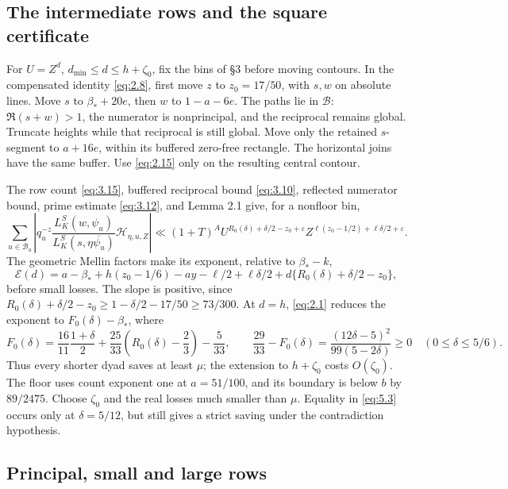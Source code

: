 \documentclass[11pt,a4paper]{article}
\begin{document}
\subsection{The intermediate rows and the square certificate}\label{sec:5.1}

For \(U=Z^d\), \(d_{\min}\le d\le h+\zeta_0\), fix the bins of §3 before moving contours. In the compensated identity \eqref{eq:2.8}, first move \(z\) to \(z_0=17/50\), with \(s,w\) on absolute lines. Move \(s\) to \(\beta_*+20e\), then \(w\) to \(1-a-6e\). The paths lie in \(\mathcal B\): \(\Re(s+w)>1\), the numerator is nonprincipal, and the reciprocal remains global. Truncate heights while that reciprocal is still global. Move only the retained \(s\)-segment to \(a+16e\), within its buffered zero-free rectangle. The horizontal joins have the same buffer. Use \eqref{eq:2.15} only on the resulting central contour.

The row count \eqref{eq:3.15}, buffered reciprocal bound \eqref{eq:3.10}, reflected numerator bound, prime estimate \eqref{eq:3.12}, and Lemma 2.1 give, for a nonfloor bin, \[
 \sum_{u\in\mathcal B_a}
 \left|q_u^{-z}\frac{L_K^S(w,\psi_u)}{L_K^S(s,\eta\overline{\psi_u})}
 \mathcal H_{\eta,u,Z}\right|
 \ll(1+T)^A U^{R_0(\delta)+\delta/2-z_0+\varepsilon}
 Z^{\ell(z_0-1/2)+\ell\delta/2+\varepsilon}.
\tag{5.1}\label{eq:5.1}
\] The geometric Mellin factors make its exponent, relative to \(\beta_*-k\), \[
 \mathcal E(d)=a-\beta_*+h(z_0-1/6)-ay-\ell/2+\ell\delta/2
 +d\{R_0(\delta)+\delta/2-z_0\},
\tag{5.2}\label{eq:5.2}
\] before small losses. The slope is positive, since \(R_0(\delta)+\delta/2-z_0\ge1-\delta/2-17/50\ge73/300\). At \(d=h\), \eqref{eq:2.1} reduces the exponent to \(F_0(\delta)-\beta_*\), where \[
 F_0(\delta)=\frac{16}{11}\frac{1+\delta}{2}
       +\frac{25}{33}\left(R_0(\delta)-\frac23\right)-\frac5{33},\qquad
 \boxed{\frac{29}{33}-F_0(\delta)=
 \frac{(12\delta-5)^2}{99(5-2\delta)}\ge0}
 \quad(0\le\delta\le5/6).
\tag{5.3}\label{eq:5.3}
\] Thus every shorter dyad saves at least \(\mu\); the extension to \(h+\zeta_0\) costs \(O(\zeta_0)\). The floor uses count exponent one at \(a=51/100\), and its boundary is below \(b\) by \(89/2475\). Choose \(\zeta_0\) and the real losses much smaller than \(\mu\). Equality in \eqref{eq:5.3} occurs only at \(\delta=5/12\), but still gives a strict saving under the contradiction hypothesis.

\subsection{Principal, small and large rows}\label{sec:5.2}
\end{document}
